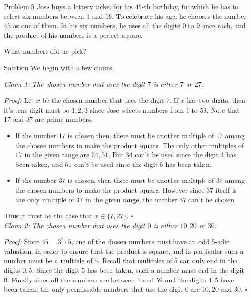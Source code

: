 \documentclass{article}
\begin{document}
\begin{problem}{Problem 5}
Jose buys a lottery ticket for his $45$-th birthday, for which he has to
select six numbers between 1 and $59$.
To celebrate his age, he chooses the number $45$ as one of them. In his six
numbers, he uses all the
digits $0$ to $9$ once each, and the product of his numbers is a perfect
square.
\vspace{0.2cm}

What numbers did he pick?
\end{problem}

\begin{solution}{Solution}
We begin with a few claims.
\vspace{0.2cm}

\textit{Claim 1: The chosen number that uses the digit $7$ is either $7$ or $27$.}
\vspace{0.2cm}

\textit{Proof:} Let $x$ be the chosen number that uses the digit $7$. If $x$ has
two digits, then it's tens digit must be $1,2,3$ since Jose selects numbers from
$1$ to $59$. Note that $17$ and $37$ are prime numbers.
\begin{itemize}
\item If the number $17$ is chosen then, there must be another multiple of $17$
among the chosen numbers to make the product square. The only other multiples of
$17$ in the given range are $34, 51$. But $34$ can't be used since the digit $4$
has been taken, and $51$ can't be used since the digit $5$ has been taken.
\item If the number $37$ is chosen, then there must be another multiple of $37$
among the chosen numbers to make the product square. However since $37$ itself is
the only multiple of $37$ in the given range, the number $37$ can't be chosen.
\end{itemize}
Thus it must be the case that $x \in \{ 7, 27 \}$. $\square$
\\

\textit{Claim 2: The chosen number that uses the digit $0$ is either $10, 20$ or
$30$.}
\vspace{0.2cm}

\textit{Proof:} Since $45 = 3^2 \cdot 5$, one of the chosen numbers must have an
odd $5$-adic valuation, in order to ensure that the product is square, and in
particular such a number must be a multiple of $5$. Recall that multiples of $5$
can only end in the digits $0, 5$. Since the digit $5$ has been taken, such a
number must end in the digit $0$. Finally since all the numbers are between
$1$ and $59$ and the digits $4, 5$ have been taken, the only permissable
numbers that use the digit $0$ are $10, 20$ and $30$. $\square$
\\


\end{solution}
\end{document}
